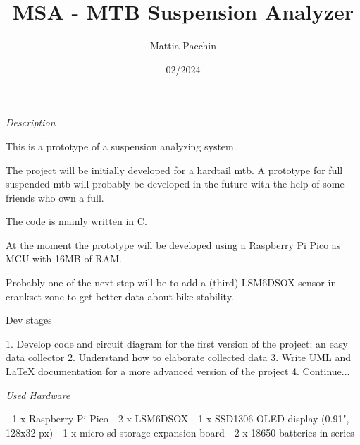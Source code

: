 \documentclass[a4paper, 12pt]{article}
\begin{document}
\title{MSA - MTB Suspension Analyzer}
\author{Mattia Pacchin}
\date{02/2024}
\maketitle

\emph{Description}

This is a prototype of a suspension analyzing system.

The project will be initially developed for a hardtail mtb. A prototype for full suspended mtb will probably be developed in the future with the help of some friends who own a full.

The code is mainly written in C. 

At the moment the prototype will be developed using a Raspberry Pi Pico as MCU with 16MB of RAM.

Probably one of the next step will be to add a (third) LSM6DSOX sensor in crankset zone to get better data about bike stability.

Dev stages

1. Develop code and circuit diagram for the first version of the project: an easy data collector
2. Understand how to elaborate collected data
3. Write UML and LaTeX documentation for a more advanced version of the project
4. Continue...

\emph{Used Hardware}

- 1 x Raspberry Pi Pico
- 2 x LSM6DSOX
- 1 x SSD1306 OLED display (0.91", 128x32 px)
- 1 x micro sd storage expansion board
- 2 x 18650 batteries in series
\end{document}

